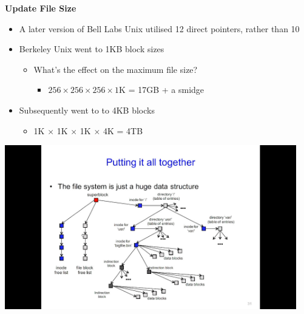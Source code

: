 \documentclass[11pt,a4paper]{article}
\begin{document}
\textbf{Update File Size}
\begin{itemize}
    \item A later version of Bell Labs Unix utilised 12 direct pointers, rather than 10
    \item Berkeley Unix went to 1KB block sizes
        \begin{itemize}
            \item What's the effect on the maximum file size?
                \begin{itemize}
                    \item $256 \times 256 \times 256 \times 1\mathrm{K}$ = 17GB + a smidge
                \end{itemize}
        \end{itemize}
    \item Subsequently went to to 4KB blocks
        \begin{itemize}
            \item 1K $\times$ 1K $\times$ 1K $\times$ 4K = 4TB
        \end{itemize}
\end{itemize}

\includegraphics[height=270]{putting-it-all-together.jpg}
\end{document}
